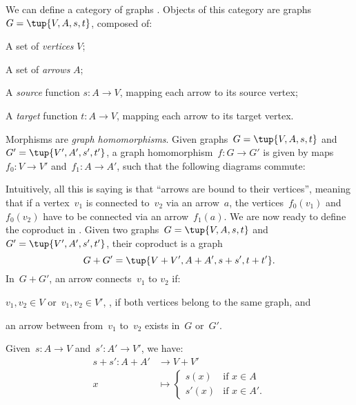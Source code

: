 \begin{example}
  \label{def:Graph}
  We can define a category of graphs \iindex{\Graph}. Objects of this category are graphs~$G=\tup{V,A,s,t}$, composed of:
  \begin{compactitem}
    \item A set of \emph{vertices} $V$;
    \item A set of \emph{arrows} $A$;
    \item A \emph{source} function $s\colon A\to V$, mapping each arrow to its source vertex;
    \item A \emph{target} function $t\colon A\to V$, mapping each arrow to its target vertex.
  \end{compactitem}
  Morphisms are \emph{graph homomorphisms}. Given graphs~$G=\tup{V,A,s,t}$ and~$G'=\tup{V',A',s',t'}$, a graph homomorphism~$f\colon G\to G'$ is given by maps~$f_0\colon V\to V'$ and~$f_1\colon A\to A'$, such that the following diagrams commute:
  \begin{center}
  \end{center}
  Intuitively, all this is saying is that ``arrows are bound to their vertices'', meaning that if a vertex~$v_1$ is connected to~$v_2$ via an arrow~$a$, the vertices~$f_0(v_1)$ and~$f_0(v_2)$ have to be connected via an arrow~$f_1(a)$. We are now ready to define the coproduct in \Graph. Given two graphs~$G=\tup{V,A,s,t}$ and~$G'=\tup{V',A',s',t'}$, their coproduct is a graph
  \begin{equation*}
    G+G'=\tup{V+V',A+A',s+s',t+t'}.
  \end{equation*}
  In~$G+G'$, an arrow connects~$v_1$ to $v_2$ if:
  \begin{compactitem}
    \item $v_1,v_2\in V$ or~$v_1,v_2\in V'$, \ie , if both vertices belong to the same graph, and
    \item an arrow between from~$v_1$ to~$v_2$ exists in~$G$ or~$G'$.
  \end{compactitem}
  Given~$s\colon A\to V$ and~$s'\colon A'\to V'$, we have:
  \begin{equation*}
    \begin{aligned}
      s+ s'\colon A+ A'&\to V+ V'\\
      x&\mapsto
      \begin{cases}
        s(x)& \text{if } x\in A\\
        s'(x)&\text{if } x\in A'.
      \end{cases}

\end{aligned}
\end{equation*}
\end{example}
